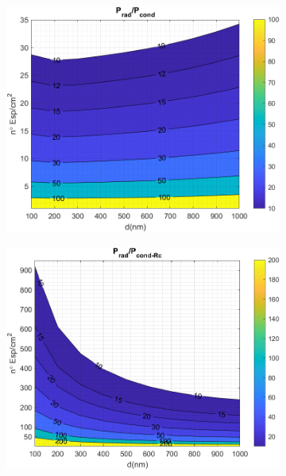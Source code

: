 \begin{figure}[H]
		\begin{subfigure}[b]{0.49\textwidth}
		\centering
		\includegraphics[width=1.00\textwidth]{figuras/Resultados/RelacionCondRad/SiGe_full.png}
		\caption{ }
		\label{fig:rel_SiSiO2Ge_full}
	\end{subfigure}
		\hfill
		\begin{subfigure}[b]{0.49\textwidth}
			\centering
			\includegraphics[width=1.00\textwidth]{figuras/Resultados/RelacionCondRad/SiGe_Rc_full_10.png}
			\caption{ }
			\label{fig:rel_SiSiO2Ge_Rc_full}

\end{subfigure}
\end{figure}
